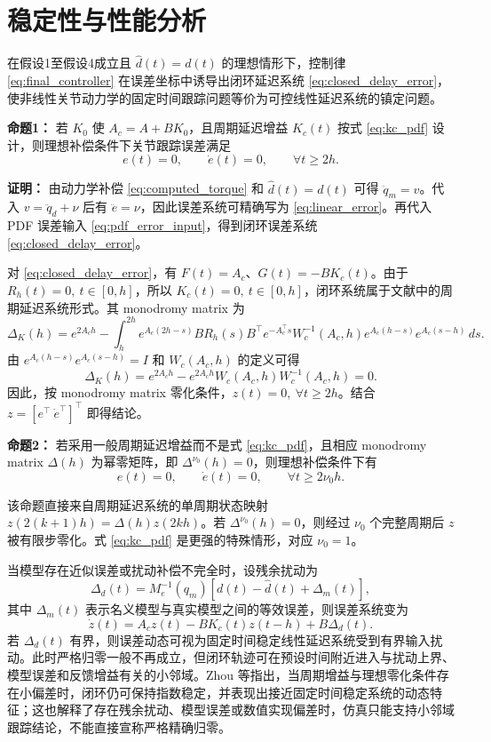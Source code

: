 \section{稳定性与性能分析}

在假设1至假设4成立且 \(\hat d(t)=d(t)\) 的理想情形下，控制律 \eqref{eq:final_controller} 在误差坐标中诱导出闭环延迟系统 \eqref{eq:closed_delay_error}，使非线性关节动力学的固定时间跟踪问题等价为可控线性延迟系统的镇定问题。

\textbf{命题1：} 若 \(K_0\) 使 \(A_c=A+BK_0\)，且周期延迟增益 \(K_c(t)\) 按式 \eqref{eq:kc_pdf} 设计，则理想补偿条件下关节跟踪误差满足
\[
e(t)=0,\qquad \dot e(t)=0,\qquad \forall t\ge 2h.
\]

\textbf{证明：} 由动力学补偿 \eqref{eq:computed_torque} 和 \(\hat d(t)=d(t)\) 可得 \(\ddot q_m=v\)。代入 \(v=\ddot q_d+\nu\) 后有 \(\ddot e=\nu\)，因此误差系统可精确写为 \eqref{eq:linear_error}。再代入 PDF 误差输入 \eqref{eq:pdf_error_input}，得到闭环误差系统 \eqref{eq:closed_delay_error}。

对 \eqref{eq:closed_delay_error}，有 \(F(t)=A_c\)、\(G(t)=-BK_c(t)\)。由于 \(R_h(t)=0,\ t\in[0,h]\)，所以 \(K_c(t)=0,\ t\in[0,h]\)，闭环系统属于文献\cite{zhouFixedtimeStabilizationLinear2022}中的周期延迟系统形式。其 monodromy matrix 为
\[
\Delta_K(h)=e^{2A_ch}
-\int_h^{2h}e^{A_c(2h-s)}BR_h(s)B^\top e^{-A_c^\top s}W_c^{-1}(A_c,h)e^{A_c(h-s)}e^{A_c(s-h)}\,ds.
\]
由 \(e^{A_c(h-s)}e^{A_c(s-h)}=I\) 和 \(W_c(A_c,h)\) 的定义可得
\[
\Delta_K(h)
=e^{2A_ch}
-e^{2A_ch}W_c(A_c,h)W_c^{-1}(A_c,h)
=0.
\]
因此，按 monodromy matrix 零化条件，\(z(t)=0,\ \forall t\ge2h\)。结合 \(z=[e^\top\ \dot e^\top]^\top\) 即得结论。

\textbf{命题2：} 若采用一般周期延迟增益而不是式 \eqref{eq:kc_pdf}，且相应 monodromy matrix \(\Delta(h)\) 为幂零矩阵，即 \(\Delta^{\nu_0}(h)=0\)，则理想补偿条件下有
\[
e(t)=0,\qquad \dot e(t)=0,\qquad \forall t\ge 2\nu_0h.
\]

该命题直接来自周期延迟系统的单周期状态映射 \(z(2(k+1)h)=\Delta(h)z(2kh)\)。若 \(\Delta^{\nu_0}(h)=0\)，则经过 \(\nu_0\) 个完整周期后 \(z\) 被有限步零化。式 \eqref{eq:kc_pdf} 是更强的特殊情形，对应 \(\nu_0=1\)。

当模型存在近似误差或扰动补偿不完全时，设残余扰动为
\[
\Delta_d(t)=M_e^{-1}(q_m)[d(t)-\hat d(t)+\Delta_m(t)],
\]
其中 \(\Delta_m(t)\) 表示名义模型与真实模型之间的等效误差，则误差系统变为
\[
\dot z(t)=A_cz(t)-BK_c(t)z(t-h)+B\Delta_d(t).
\]
若 \(\Delta_d(t)\) 有界，则误差动态可视为固定时间稳定线性延迟系统受到有界输入扰动。此时严格归零一般不再成立，但闭环轨迹可在预设时间附近进入与扰动上界、模型误差和反馈增益有关的小邻域。Zhou 等指出，当周期增益与理想零化条件存在小偏差时，闭环仍可保持指数稳定，并表现出接近固定时间稳定系统的动态特征\cite{zhouFixedtimeStabilizationLinear2022}；这也解释了存在残余扰动、模型误差或数值实现偏差时，仿真只能支持小邻域跟踪结论，不能直接宣称严格精确归零。

